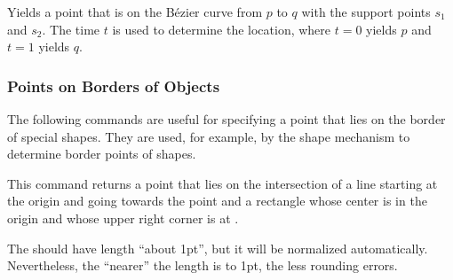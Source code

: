 \begin{command}{\pgfpointcurveattime{}}
    Yields a point that is on the Bézier curve from $p$ to $q$ with the support
    points $s_1$ and $s_2$. The time $t$ is used to determine the location,
    where $t=0$ yields $p$ and $t=1$ yields $q$.
\begin{codeexample}[]
\end{codeexample}
\end{command}


\subsubsection{Points on Borders of Objects}

The following commands are useful for specifying a point that lies on the
border of special shapes. They are used, for example, by the shape mechanism to
determine border points of shapes.

\begin{command}{\pgfpointborderrectangle{}}
    This command returns a point that lies on the intersection of a line
    starting at the origin and going towards the point 
    and a rectangle whose center is in the origin and whose upper right corner
    is at .

    The  should have length ``about 1pt'', but it will be
    normalized automatically. Nevertheless, the ``nearer'' the length is to
    1pt, the less rounding errors.
\begin{codeexample}[]
\end{codeexample}
\end{command}

